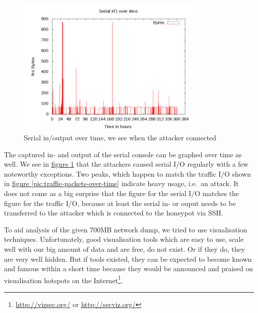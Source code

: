 \documentclass[a4paper,
    11pt,
    normalheadings,
    parindent,
    UKenglish,
    abstracton,
    ]{scrartcl}
\begin{document}
\begin{figure}
  \begin{center}\includegraphics[width=0.8\textwidth]{bin/serial-io-over-time.png}\end{center}
  \caption{Serial in/output over time, we see when the attacker connected} %
  \label{pic:serial-io-over-time}
\end{figure}
The captured in- and output of the serial console can be graphed over time as well.
We see in
\hyperref[pic:serial-io-over-time]{figure \ref*{pic:serial-io-over-time}}
that the attackers caused serial I/O regularly with a few noteworthy exceptions.
Two peaks, which happen to match the traffic I/O shown in
 \hyperref[pic:traffic-packets-over-time]{figure \ref*{pic:traffic-packets-over-time}}
indicate heavy usage, i.e.\, an attack.
It does not come as a big surprise that the figure for the serial I/O matches the  figure for the traffic I/O, because at least the serial in- or ouput needs to be transferred to the attacker which is connected to the honeypot via SSH.




To aid analysis of the given 700MB network dump, we tried to use visualisation techniques.
Unfortunately, good visualisation tools which are easy to use, scale well with our big amount of data and are free, do not exist.
Or if they do, they are very well hidden.
But if tools existed, they can be expected to become known and famous within a short time because they would be announced and praised on visualisation hotspots on the Internet\footnote{\url{http://vizsec.org/} or \url{http://secviz.org/}}.
\end{document}
